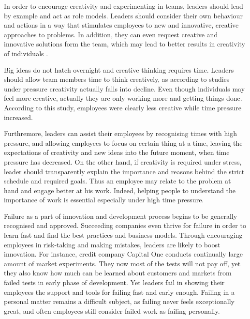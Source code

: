 In order to encourage creativity and experimenting in teams, leaders should lead by example and act as role models. Leaders should consider their own behaviour and actions in a way that stimulates employees to new and innovative, creative approaches to problems. In addition, they can even request creative and innovative solutions form the team, which may lead to better results in creativity of individuals \citep{amabile2002creativity}. \citep{mumford2002leading,amabile2008creativity,waldman1990adding}

Big ideas do not hatch overnight and creative thinking requires time. Leaders should allow team members time to think creatively, as according to studies under pressure creativity actually falls into decline. Even though individuals may feel more creative, actually they are only working more and getting things done. According to this study, employees were clearly less creative while time pressure increased. \citep{amabile2002creativity} 

Furthremore, leaders can assist their employees by recognising times with high pressure, and allowing employees to focus on certain thing at a time, leaving the expectations of creativity and new ideas into the future moment, when time pressure has decreased. On the other hand, if creativity is required under stress, leader should transparently explain the importance and reasons behind the strict schedule and required goals. Thus an employee may relate to the problem at hand and engage better at his work. Indeed, helping people to understand the importance of work is essential especially under high time pressure. \citep{amabile2002creativity} 

Failure as a part of innovation and development process begins to be generally recognised and approved. Succeeding companies even thrive for failure in order to learn fast and find the best practices and business models. Through encouraging employees in risk-taking and making mistakes, leaders are likely to boost innovation. For instance, credit company Capital One conducts continually large amount of market experiments. They now most of the tests will not pay off, yet they also know how much can be learned about customers and markets from failed tests in early phase of development. Yet leaders fail in showing their employees the support and tools for failing fast and early enough. Failing in a personal matter remains a difficult subject, as failing never feels exceptionally great, and often employees still consider failed work as failing personally. \citep{farson2002failuretolerantleader}

